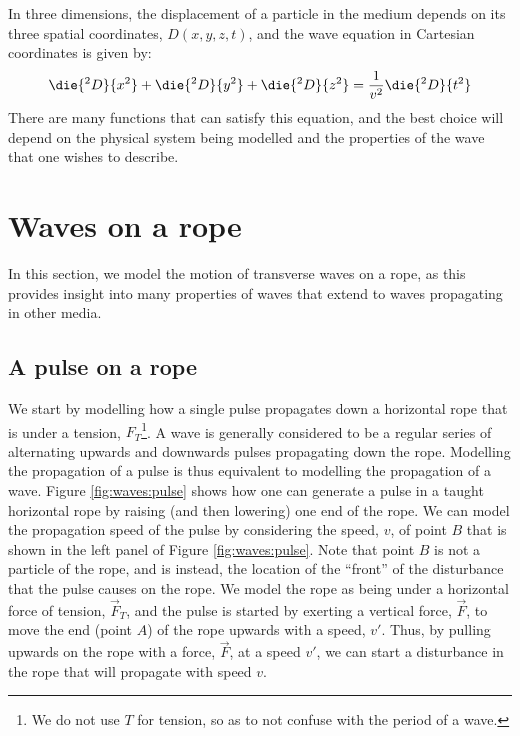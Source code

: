 In three dimensions, the displacement of a particle in the medium depends on its three spatial coordinates, $D(x,y,z,t)$, and the wave equation in Cartesian coordinates is given by:
\begin{align*}
\die{^2D}{x^2}+\die{^2D}{y^2}+\die{^2D}{z^2}&=\frac{1}{v^2}\die{^2D}{t^2}\\
\end{align*}
There are many functions that can satisfy this equation, and the best choice will depend on the physical system being modelled and the properties of the wave that one wishes to describe. 

\section{Waves on a rope}
In this section, we model the motion of transverse waves on a rope, as this provides insight into many properties of waves that extend to waves propagating in other media. 

\subsection{A pulse on a rope}
We start by modelling how a single pulse propagates down a horizontal rope that is under a tension, $F_T$\footnote{We do not use $T$ for tension, so as to not confuse with the period of a wave.}. A wave is generally considered to be a regular series of alternating upwards and downwards pulses propagating down the rope. Modelling the propagation of a pulse is thus equivalent to modelling the propagation of a wave. Figure \ref{fig:waves:pulse} shows how one can generate a pulse in a taught horizontal rope by raising (and then lowering) one end of the rope.
We can model the propagation speed of the pulse by considering the speed, $v$, of point $B$ that is shown in the left panel of Figure \ref{fig:waves:pulse}. Note that point $B$ is not a particle of the rope, and is instead, the location of the ``front'' of the disturbance that the pulse causes on the rope. We model the rope as being under a horizontal force of tension, $\vec F_T$, and the pulse is started by exerting a vertical force, $\vec F$, to move the end (point $A$) of the rope upwards with a speed, $v'$. Thus, by pulling upwards on the rope with a force, $\vec F$, at a speed $v'$, we can start a disturbance in the rope that will propagate with speed $v$. 

